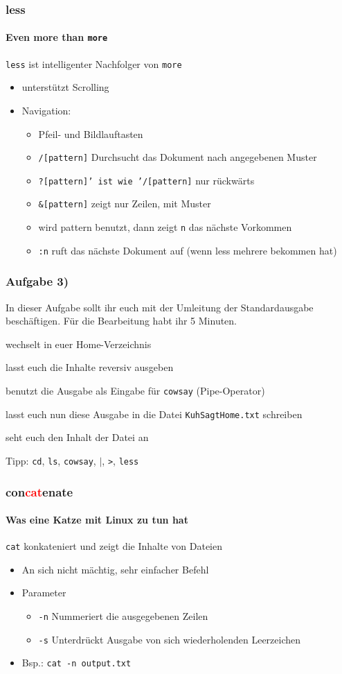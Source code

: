 \documentclass[12pt,utf8, handout]{beamer}
\begin{document}
\begin{frame}
\frametitle{less}
\framesubtitle{\textcolor{ownDarkOr}{Even more than \texttt{more}}}
\texttt{less} ist intelligenter Nachfolger von \texttt{more}
\begin{itemize}
	\item unterstützt Scrolling
	\item Navigation:
	\begin{itemize}[<+->]
		\item Pfeil- und Bildlauftasten
		\item \texttt{/[pattern]} Durchsucht das Dokument nach angegebenen Muster
		\item \texttt{?[pattern]' ist wie '/[pattern]} nur rückwärts
		\item \texttt{\&[pattern]} zeigt nur Zeilen, mit Muster
		\item wird pattern benutzt, dann zeigt \texttt{n} das nächste Vorkommen
		\item \texttt{:n} ruft das nächste Dokument auf (wenn less mehrere bekommen hat)
	\end{itemize}
\end{itemize}
\end{frame}

\begin{frame}
\frametitle{Aufgabe 3)}
In dieser Aufgabe sollt ihr euch mit der Umleitung der Standardausgabe beschäftigen. Für die Bearbeitung habt ihr 5 Minuten.
\begin{itemize}
	{\footnotesize
	\item wechselt in euer Home-Verzeichnis
	\item lasst euch die Inhalte reversiv ausgeben
	\item benutzt die Ausgabe als Eingabe für \texttt{cowsay} (Pipe-Operator)
	\item lasst euch nun diese Ausgabe in die Datei \texttt{KuhSagtHome.txt} schreiben
	\item seht euch den Inhalt der Datei an
	}
\end{itemize}
{\scriptsize Tipp: \texttt{cd}, \texttt{ls}, \texttt{cowsay}, \texttt{$\mid$}, \texttt{>}, \texttt{less}}
\end{frame}

\begin{frame}
\frametitle{con\textcolor{red}{cat}enate}
\framesubtitle{\textcolor{ownDarkOr}{Was eine Katze mit Linux zu tun hat}}
\texttt{cat} konkateniert und zeigt die Inhalte von Dateien
\begin{itemize}[<+->]
	\item An sich nicht mächtig, sehr einfacher Befehl
	\item Parameter
	\begin{itemize}
		\item \texttt{-n} Nummeriert die ausgegebenen Zeilen 
		\item \texttt{-s} Unterdrückt Ausgabe von sich wiederholenden Leerzeichen
	\end{itemize}
	\item Bsp.: \texttt{cat -n output.txt}
\end{itemize}
\end{frame}
\end{document}
